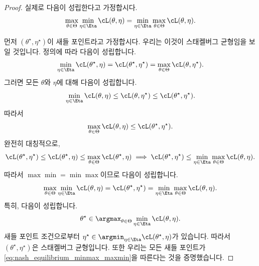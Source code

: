 \documentclass[../../book-main_ko.tex]{subfiles}
\begin{document}
\begin{proof} %
    실제로 다음이 성립한다고 가정합시다.
    \begin{equation}
        \max_{\theta \in \Theta}\min_{\eta \in \Eta}\cL(\theta, \eta) = \min_{\eta \in \Eta}\max_{\theta  \in \Theta}\cL(\theta, \eta).
    \end{equation}

    먼저 \((\theta^{\star}, \eta^{\star})\)이 새들 포인트라고 가정합시다. 우리는 이것이 스태켈버그 균형임을 보일 것입니다. 정의에 따라 다음이 성립합니다.
    \begin{equation}
        \min_{\eta \in \Eta}\cL(\theta^{\star}, \eta) = \cL(\theta^{\star}, \eta^{\star}) = \max_{\theta \in \Theta}\cL(\theta, \eta^{\star}).
    \end{equation}
    그러면 모든 \(\theta\)와 \(\eta\)에 대해 다음이 성립합니다.
    \begin{equation}
        \min_{\eta \in \Eta}\cL(\theta, \eta) \leq \cL(\theta, \eta^{\star}) \leq \cL(\theta^{\star}, \eta^{\star}).
    \end{equation}
    따라서
    \begin{equation}
        \max_{\theta \in \Theta}\cL(\theta, \eta) \leq \cL(\theta^{\star}, \eta^{\star}).
    \end{equation}
    완전히 대칭적으로,
    \begin{equation}
        \cL(\theta^{\star}, \eta^{\star}) \leq \cL(\theta^{\star}, \eta) \leq \max_{\theta \in \Theta}\cL(\theta^{\star}, \eta) \implies \cL(\theta^{\star}, \eta^{\star}) \leq \min_{\eta \in \Eta}\max_{\theta \in \Theta}\cL(\theta, \eta).
    \end{equation}
    따라서 \(\max\min = \min\max\)이므로 다음이 성립합니다.
    \begin{equation}\label{eq:nash_equilibrium_minmax_maxmin}
        \max_{\theta \in \Theta}\min_{\eta \in \Eta}\cL(\theta, \eta) = \cL(\theta^{\star}, \eta^{\star}) = \min_{\eta \in \Eta}\max_{\theta \in \Theta}\cL(\theta, \eta).
    \end{equation}
    특히, 다음이 성립합니다.
    \begin{equation}
        \theta^{\star} \in \argmax_{\theta \in \Theta}\min_{\eta \in \Eta}\cL(\theta, \eta).
    \end{equation}
    새들 포인트 조건으로부터 \(\eta^{\star} \in \argmin_{\eta \in \Eta}\cL(\theta^{\star}, \eta)\)가 있습니다. 따라서 \((\theta^{\star}, \eta^{\star})\)은 스태켈버그 균형입니다. 또한 우리는 모든 새들 포인트가 \eqref{eq:nash_equilibrium_minmax_maxmin}을 따른다는 것을 증명했습니다.


\end{proof}
\end{document}
